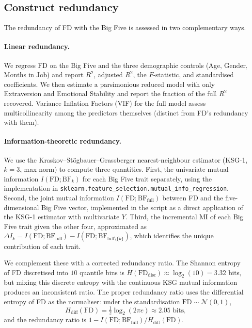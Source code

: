 \documentclass[11pt,a4paper]{article}
\begin{document}
\subsection{Construct redundancy}
\label{sec:method-redundancy}

The redundancy of FD with the Big Five is assessed in two
complementary ways.

\paragraph{Linear redundancy.} We regress FD on the Big Five and the
three demographic controls (Age, Gender, Months in Job) and report
$R^2$, adjusted $R^2$, the $F$-statistic, and standardised
coefficients. We then estimate a parsimonious reduced model with
only Extraversion and Emotional Stability and report the fraction of
the full $R^2$ recovered. Variance Inflation Factors (VIF) for the
full model assess multicollinearity among the predictors themselves
(distinct from FD's redundancy with them).

\paragraph{Information-theoretic redundancy.} We use the
Kraskov--Stögbauer--Grassberger nearest-neighbour estimator
\citep{kraskov2004} (KSG-1, $k=3$, max norm) to compute three
quantities. First, the univariate mutual information
$I(\text{FD}; \text{BF}_k)$ for each Big Five trait separately,
using the implementation in
\texttt{sklearn.feature\_selection.mutual\_info\_regression}. Second,
the joint mutual information $I(\text{FD}; \text{BF}_{\text{full}})$
between FD and the five-dimensional Big Five vector, implemented in
the script as a direct application of the KSG-1 estimator with
multivariate $Y$. Third, the incremental MI of each Big Five trait
given the other four, approximated as
$\Delta I_k = I(\text{FD};\text{BF}_{\text{full}}) -
I(\text{FD}; \text{BF}_{\text{full}\setminus\{k\}})$, which identifies
the unique contribution of each trait.

We complement these with a corrected redundancy ratio. The Shannon
entropy of FD discretised into $10$ quantile bins is
$H(\text{FD}_{\text{disc}}) \approx \log_2(10) = 3.32$ bits, but
mixing this discrete entropy with the continuous KSG mutual
information produces an inconsistent ratio. The proper redundancy
ratio uses the differential entropy of FD as the normaliser: under
the standardisation $\text{FD} \sim \mathcal{N}(0,1)$,
\begin{equation}
H_{\text{diff}}(\text{FD}) = \tfrac{1}{2} \log_2(2 \pi e) \approx
2.05 \text{ bits},
\end{equation}
and the redundancy ratio is
$1 - I(\text{FD}; \text{BF}_{\text{full}}) /
H_{\text{diff}}(\text{FD})$.
\end{document}
